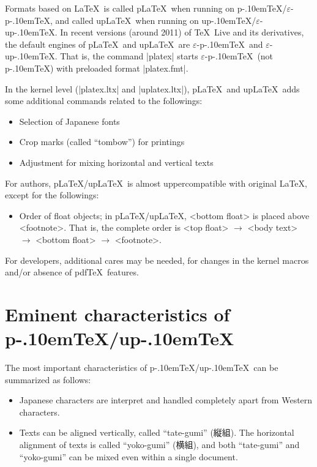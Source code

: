 \documentclass[a4paper,11pt]{article}
\def\epTeX{$\varepsilon$-\pTeX}\def\eTeX{$\varepsilon$-\TeX}
\def\eupTeX{$\varepsilon$-\upTeX}\def\upTeX{u\pTeX}
\def\pTeX{p\kern-.10em\TeX}
\def\pLaTeX{p\LaTeX}\def\upLaTeX{u\pLaTeX}
\def\pdfTeX{pdf\TeX}
\begin{document}
Formats based on \LaTeX\ is called \pLaTeX\ when running on \pTeX/\epTeX,
and called \upLaTeX\ when running on \upTeX/\eupTeX.
In recent versions (around 2011) of \TeX\ Live and its derivatives,
the default engines of \pLaTeX\ and \upLaTeX\ are \epTeX\ and \eupTeX.
That is, the command |platex| starts \epTeX\ (not \pTeX) with
preloaded format |platex.fmt|.

In the kernel level (|platex.ltx| and |uplatex.ltx|),
\pLaTeX\ and \upLaTeX\ adds some additional commands
related to the followings:
\begin{itemize}
  \item Selection of Japanese fonts
  \item Crop marks (called ``tombow'') for printings
  \item Adjustment for mixing horizontal and vertical texts
\end{itemize}
For authors, \pLaTeX/\upLaTeX\ is almost uppercompatible with
original \LaTeX, except for the followings:
\begin{itemize}
  \item Order of float objects; in \pLaTeX/\upLaTeX,
    <bottom float> is placed above <footnote>.
    That is, the complete order is
    <top float> $\rightarrow$ <body text> $\rightarrow$
    <bottom float> $\rightarrow$ <footnote>.
\end{itemize}
For developers, additional cares may be needed,
for changes in the kernel macros and/or absence of \pdfTeX\ features.

\section{Eminent characteristics of \pTeX/\upTeX}

The most important characteristics of \pTeX/\upTeX\ can be
summarized as follows:
\begin{itemize}
  \item Japanese characters are interpret and handled completely apart from
    Western characters.
  \item Texts can be aligned vertically, called ``tate-gumi'' (縦組).
    The horizontal alignment of texts is called ``yoko-gumi'' (横組),
    and both ``tate-gumi'' and ``yoko-gumi'' can be mixed
    even within a single document.
\end{itemize}
\end{document}
